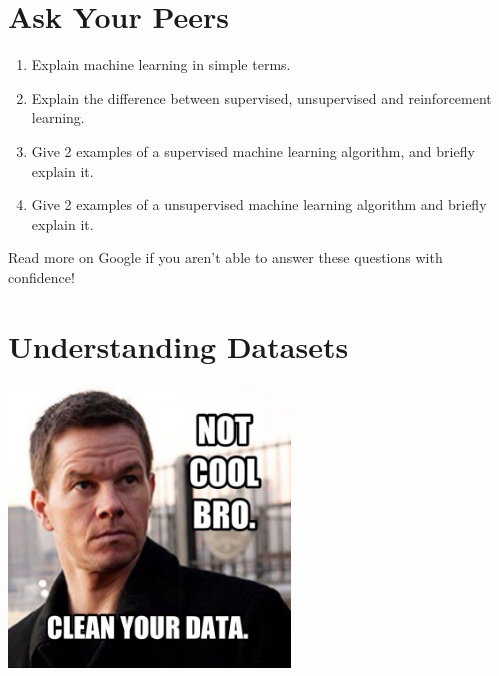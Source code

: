 \documentclass{42-en}
\begin{document}
\chapter{Ask Your Peers}

\begin{enumerate}
    \item Explain machine learning in simple terms.
    \item Explain the difference between supervised, unsupervised and reinforcement learning.
    \item Give 2 examples of a supervised machine learning algorithm, and briefly explain it.
    \item Give 2 examples of a unsupervised machine learning algorithm and briefly explain it.
\end{enumerate}

Read more on Google if you aren't able to answer these questions with confidence!



\chapter{Understanding Datasets}

\centerline{\includegraphics[width=75mm]{images/data_meme.jpg}}
\end{document}
